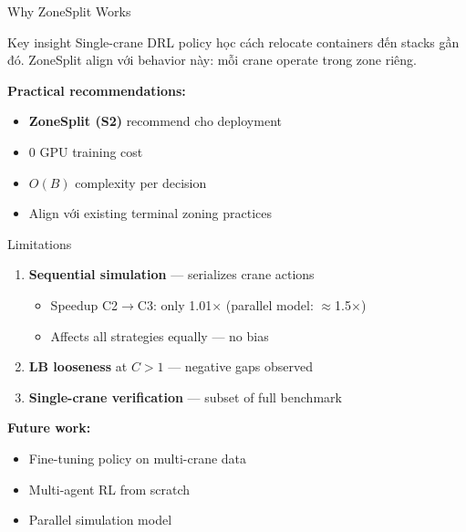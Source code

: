 \documentclass[aspectratio=169,11pt]{beamer}
\begin{document}
\begin{frame}{Why ZoneSplit Works}
\begin{block}{Key insight}
Single-crane DRL policy học cách relocate containers đến stacks gần đó. ZoneSplit align với behavior này: mỗi crane operate trong zone riêng.
\end{block}

\vspace{0.3cm}
\textbf{Practical recommendations:}
\begin{itemize}
    \item \textbf{ZoneSplit (S2)} recommend cho deployment
    \item 0 GPU training cost
    \item $O(B)$ complexity per decision
    \item Align với existing terminal zoning practices
\end{itemize}
\end{frame}

\begin{frame}{Limitations}
\begin{enumerate}
    \item \textbf{Sequential simulation} — serializes crane actions
    \begin{itemize}
        \item Speedup C2$\to$C3: only 1.01$\times$ (parallel model: $\approx$1.5$\times$)
        \item Affects all strategies equally — no bias
    \end{itemize}
    \item \textbf{LB looseness} at $C>1$ — negative gaps observed
    \item \textbf{Single-crane verification} — subset of full benchmark
\end{enumerate}

\vspace{0.3cm}
\textbf{Future work:}
\begin{itemize}
    \item Fine-tuning policy on multi-crane data
    \item Multi-agent RL from scratch
    \item Parallel simulation model
\end{itemize}
\end{frame}
\end{document}
